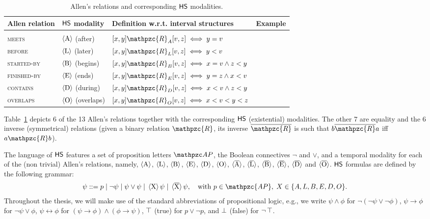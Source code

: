 \begin{sidewaystable}
\renewcommand{\arraystretch}{1.4}
\centering
\caption{Allen's relations and corresponding $\text{\sffamily HS}$ modalities.}\label{allen}
\begin{tabular}{lllc}
\hline
\rule[-1ex]{0pt}{3.5ex} Allen relation & $\text{\sffamily HS}$ modality & Definition w.r.t. interval structures &  Example\\
\hline

&   &   & \multirow{7}{*}{}\\

\textsc{meets} & $\operatorname{\langle A\rangle}$ (after) & $[x,y]\mathpzc{R}_A[v,z]\iff y=v$ &\\

\textsc{before} & $\operatorname{\langle L\rangle}$ (later) & $[x,y]\mathpzc{R}_L[v,z]\iff y<v$ &\\

\textsc{started-by} & $\operatorname{\langle B\rangle}$ (begins) & $[x,y]\mathpzc{R}_B[v,z]\iff x=v\wedge z<y$ &\\

\textsc{finished-by} & $\operatorname{\langle E\rangle}$ (ends) & $[x,y]\mathpzc{R}_E[v,z]\iff y=z\wedge x<v$ &\\

\textsc{contains} & $\operatorname{\langle D\rangle}$ (during) & $[x,y]\mathpzc{R}_D[v,z]\iff x<v\wedge z<y$ &\\

\textsc{overlaps} & $\operatorname{\langle O\rangle}$ (overlaps) & $[x,y]\mathpzc{R}_O[v,z]\iff x<v<y<z$ &\\

\hline
\end{tabular}
\end{sidewaystable}
Table~\ref{allen} depicts 6 of the 13 Allen's relations
together with the corresponding $\text{\sffamily HS}$ (existential) modalities. 
The other 7 are equality and the 6 inverse (symmetrical) relations 
(given a binary relation $\mathpzc{R}$, its inverse $\overline{\mathpzc{R}}$ is such that $b \overline{\mathpzc{R}} a$ iff $a \mathpzc{R} b$). 

The language of $\text{\sffamily HS}$ features a set of proposition letters $\Prop$, the Boolean connectives $\neg$ and $\vee$, and a temporal modality for each of the (non trivial) Allen's relations, namely, $\operatorname{\langle A\rangle}$, $\operatorname{\langle L\rangle}$, $\operatorname{\langle B\rangle}$, $\operatorname{\langle E\rangle}$, $\operatorname{\langle D\rangle}$, $\operatorname{\langle O\rangle}$, $\operatorname{\langle \overline{A}\rangle}$, $\operatorname{\langle \overline{L}\rangle}$, $\operatorname{\langle \overline{B}\rangle}$, $\operatorname{\langle \overline{E}\rangle}$, $\operatorname{\langle \overline{D}\rangle}$ and $\operatorname{\langle \overline{O}\rangle}$.
$\text{\sffamily HS}$ formulas are defined by the following grammar:
\begin{equation*}
    \psi ::= p \;\vert\; \neg\psi \;\vert\; \psi \vee \psi \;\vert\; \hsX\psi \;\vert\; \hsXt\psi, \ \ \mbox{ with } p\in\mathpzc{AP},\; X\in\{A,L,B,E,D,O\}.
\end{equation*}
%
Throughout the thesis, we will make use of the standard abbreviations of propositional logic, e.g., we write $\psi \wedge \phi$ for $\neg(\neg\psi \vee \neg\phi)$, $\psi \rightarrow \phi$ for $\neg \psi \vee \phi$, $\psi \leftrightarrow \phi$ for $\left(\psi \rightarrow \phi\right)\wedge\left(\phi \rightarrow \psi\right)$, $\operatorname{\top}$ (true) for $p\vee\neg p$, and $\operatorname{\bot}$ (false) for $\neg\operatorname{\top}$.

